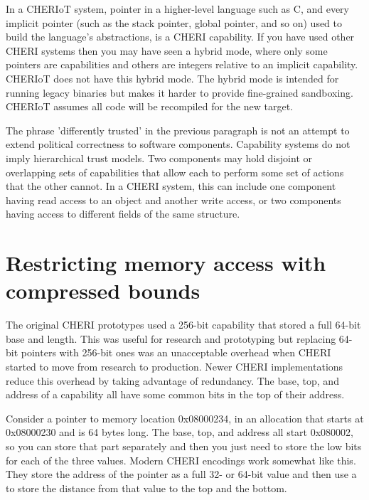 \begin{note}
	In a CHERIoT system,  pointer in a higher-level language such as C, and every implicit pointer (such as the stack pointer, global pointer, and so on) used to build the language's abstractions, is a CHERI capability.
	If you have used other CHERI systems then you may have seen a hybrid mode, where only some pointers are capabilities and others are integers relative to an implicit capability.
	CHERIoT does not have this hybrid mode.
	The hybrid mode is intended for running legacy binaries but makes it harder to provide fine-grained sandboxing.
	CHERIoT assumes all code will be recompiled for the new target.
\end{note}

The phrase 'differently trusted' in the previous paragraph is not an attempt to extend political correctness to software components.
Capability systems do not imply hierarchical trust models.
Two components may hold disjoint or overlapping sets of capabilities that allow each to perform some set of actions that the other cannot.
In a CHERI system, this can include one component having read access to an object and another write access, or two components having access to different fields of the same structure.

\section{Restricting memory access with compressed bounds}

The original CHERI prototypes used a 256-bit capability that stored a full 64-bit base and length.
This was useful for research and prototyping but replacing 64-bit pointers with 256-bit ones was an unacceptable overhead when CHERI started to move from research to production.
Newer CHERI implementations reduce this overhead by taking advantage of redundancy.
The base, top, and address of a capability all have some common bits in the top of their address.


Consider a pointer to memory location 0x08000234, in an allocation that starts at 0x08000230 and is 64 bytes long.
The base, top, and address all start 0x080002, so you can store that part separately and then you just need to store the low bits for each of the three values.
Modern CHERI encodings work somewhat like this.
They store the address of the pointer as a full 32- or 64-bit value and then use a  to store the distance from that value to the top and the bottom.

